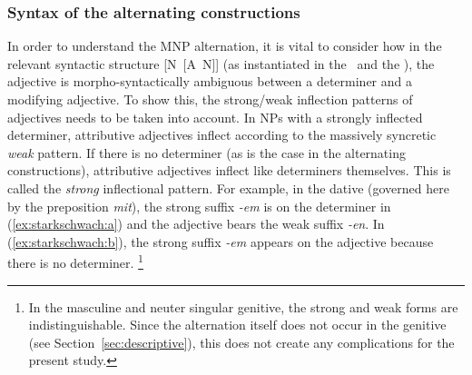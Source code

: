 \subsubsection{Syntax of the alternating constructions}
\label{sec:syntax}

In order to understand the MNP alternation, it is vital to consider how in the relevant syntactic structure [N~[A~N]] (as instantiated in the \NACa\ and the \PGCa), the adjective is morpho-syntactically ambiguous between a determiner and a modifying adjective.
To show this, the strong\slash weak inflection patterns of adjectives needs to be taken into account.
In NPs with a strongly inflected determiner, attributive adjectives inflect according to the massively syncretic \textit{weak} pattern.
If there is no determiner (as is the case in the alternating constructions), attributive adjectives inflect like determiners themselves.
This is called the \textit{strong} inflectional pattern.
For example, in the dative (governed here by the preposition \textit{mit}), the strong suffix \textit{-em} is on the determiner in (\ref{ex:starkschwach:a}) and the adjective bears the weak suffix \textit{-en}. 
In (\ref{ex:starkschwach:b}), the strong suffix \textit{-em} appears on the adjective because there is no determiner.%
\footnote{In the masculine and neuter singular genitive, the strong and weak forms are indistinguishable.
Since the alternation itself does not occur in the genitive (see Section~\ref{sec:descriptive}), this does not create any complications for the present study.}

\begin{exe}
  \ex\label{ex:starkschwach} 
  \begin{xlist}
  \end{xlist}
\end{exe}

